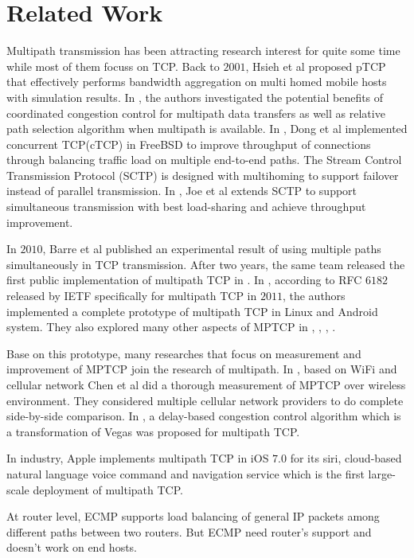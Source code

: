 \section{Related Work}
\label{sec:related}
Multipath transmission has been attracting research interest for quite some time while most of them focuss on TCP. Back to $2001$, Hsieh et al proposed pTCP\cite{hsieh01} that effectively performs bandwidth aggregation on multi homed mobile hosts with simulation results. In \cite{key01}, the authors investigated the potential benefits of coordinated congestion control for multipath data transfers as well as relative path selection algorithm when multipath is available. In \cite{dong01}, Dong et al implemented concurrent TCP(cTCP) in FreeBSD  to improve throughput of connections through balancing traffic load on multiple end-to-end paths. The Stream Control Transmission Protocol (SCTP)\cite{sctp} is designed with multihoming to support failover instead of parallel transmission. In \cite{joe01}, Joe et al extends SCTP to support simultaneous transmission with best load-sharing and achieve throughput improvement.

In $2010$, Barre et al published an experimental result of using multiple paths simultaneously in TCP transmission. After two years, the same team released the first public implementation of multipath TCP in \cite{mptcp}. In \cite{mptcp}, according to RFC $6182$ released by IETF specifically for multipath TCP in $2011$, the authors implemented a complete prototype of multipath TCP in Linux and Android system. They also explored many other aspects of MPTCP in \cite{PDDRB12}, \cite{DPLMAB13}, \cite{PKB13}, \cite{PFAB14}.

Base on this prototype, many researches that focus on measurement and improvement of MPTCP join the research of multipath. In \cite{chen01}, based on WiFi and cellular network Chen et al did a thorough measurement of MPTCP over wireless environment. They considered multiple cellular network providers to do complete side-by-side comparison. In \cite{cao01}, a delay-based congestion control algorithm which is a transformation of Vegas\cite{vegas} was proposed for multipath TCP.

In industry, Apple\cite{apple} implements multipath TCP in iOS $7.0$ for its siri, cloud-based natural language voice command and navigation service which is the first large-scale deployment of multipath TCP. 

At router level, ECMP\cite{ecmp} supports load balancing of general IP packets among different paths between two routers. But ECMP need router's support and doesn't work on end hosts. 